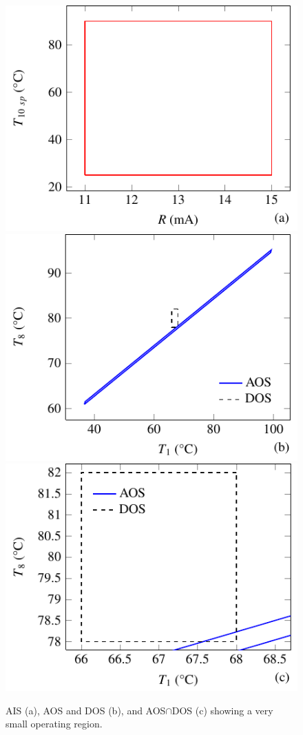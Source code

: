 \documentclass[final,authoryear,5pt,times,twocolumn]{elsarticle}
\begin{document}
\begin{figure}[htbp]
  \centering
    \includegraphics{figure2a.pdf}
    \includegraphics{figure2b.pdf}
    \includegraphics{figure2c.pdf}
  \caption{AIS (a), AOS and DOS (b), and AOS$\cap$DOS (c) showing a very small operating region.}
  \label{fig:columnaisaos}
\end{figure}
\end{document}
